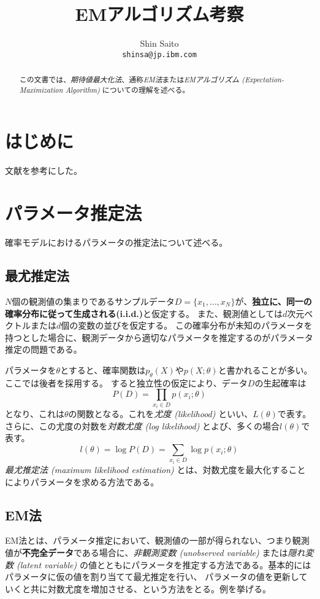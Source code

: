 \documentclass[9pt,draft,twocolumn]{jsarticle}
\begin{document}
\title{EMアルゴリズム考察}
\author{Shin Saito\\ \texttt{shinsa@jp.ibm.com}}
\maketitle
\begin{abstract}
この文書では、\emph{期待値最大化法}、通称\emph{EM法}または\emph{EMアルゴリズム (Expectation-Maximization Algorithm)}
についての理解を述べる。
\end{abstract}
\section{はじめに}
文献\cite{takamura10, kita99}を参考にした。

\section{パラメータ推定法}
確率モデルにおけるパラメータの推定法について述べる。
\subsection{最尤推定法}
$N$個の観測値の集まりであるサンプルデータ$D=\{x_1,
\ldots,x_N\}$が、\textbf{独立に、同一の確率分布に従って生成される(i.i.d.)}と仮定する。
また、観測値としては$d$次元ベクトルまたは$d$個の変数の並びを仮定する。
この確率分布が未知のパラメータを持つとした場合に、観測データから適切なパラメータを推定するのがパラメータ推定の問題である。

パラメータを$\theta$とすると、確率関数は$p_\theta(X)$や$p(X;\theta)$と書かれることが多い。ここでは後者を採用する。
すると独立性の仮定により、データ$D$の生起確率は
\[ P(D)= \prod_{x_i\in D} p(x_i;\theta) \]
となり、これは$\theta$の関数となる。これを\emph{尤度 (likelihood)}
といい、$L(\theta)$で表す。さらに、この尤度の対数を\emph{対数尤度 (log likelihood)} とよび、多くの場合$l(\theta)$で表す。
\[ l(\theta) = \log P(D)= \sum_{x_i\in D} \log p(x_i;\theta) \]
\emph{最尤推定法 (maximum likelihood estimation)} とは、対数尤度を最大化することによりパラメータを求める方法である。

\subsection{EM法}
EM法とは、パラメータ推定において、観測値の一部が得られない、つまり観測値が\textbf{不完全データ}である場合に、\emph{非観測変数
(unobserved variable)} または\emph{隠れ変数 (latent variable)}
の値とともにパラメータを推定する方法である。基本的にはパラメータに仮の値を割り当てて最尤推定を行い、
パラメータの値を更新していくと共に対数尤度を増加させる、という方法をとる。例を挙げる。
\end{document}
